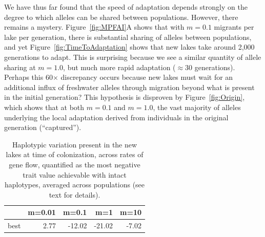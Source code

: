 \documentclass{article}
\begin{document}
We have thus far found that the speed of adaptation depends strongly
on the degree to which alleles can be shared between populations.
However, there remains a mystery.
Figure~\ref{fig:MPFAI}A shows that with $m = 0.1$ migrants per lake per generation, 
there is substantial sharing of alleles between populations,
and yet Figure~\ref{fig:TimeToAdaptation} shows that new lakes 
take around 2,000 generations to adapt.
This is surprising because we see a similar quantity of allele sharing at  $m = 1.0$, 
but much more rapid adaptation ($\approx 30$ generations). 
Perhaps this 60$\times$ discrepancy occurs because 
new lakes must wait for an additional influx of freshwater alleles through migration
beyond what is present in the initial generation?
This hypothesis is disproven by
Figure~\ref{fig:Origin}, which shows that at both $m = 0.1$ and $m = 1.0$,
the vast majority of alleles underlying the local adaptation
derived from individuals in the original generation (``captured'').

\begin{table}[ht]
    \centering
    \begin{tabular}{rrrrr}
      \hline
     & m=0.01 & m=0.1 & m=1 & m=10 \\ 
      \hline
          best & 2.77 & -12.02 & -21.02 & -7.02 \\ 
       \hline
    \end{tabular}
    \caption{
        Haplotypic variation present in the new lakes at time of colonization,
        across rates of gene flow,
        quantified as the most negative trait value achievable
            with intact haplotypes, averaged across populations
            (see text for details).
    } \label{tab:linkage}
\end{table}
\end{document}
